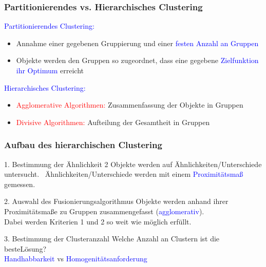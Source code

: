 \documentclass{beamer}
\begin{document}
\begin{frame}
 \frametitle{Partitionierendes vs. Hierarchisches Clustering}
 \textcolor{blue}{Partitionierendes Clustering:} \\
 \begin{itemize}
  \item Annahme einer gegebenen Gruppierung und einer \textcolor{blue}{festen Anzahl an Gruppen}

  \item Objekte werden den Gruppen so zugeordnet, dass eine gegebene \textcolor{blue}{Zielfunktion ihr Optimum} erreicht
 \end{itemize}

\textcolor{blue}{Hierarchisches Clustering:} \\
 \begin{itemize}
  \item \textcolor{red}{Agglomerative Algorithmen:} Zusammenfassung der Objekte in Gruppen %

  \item \textcolor{red}{Divisive Algorithmen:} Aufteilung der Gesamtheit in Gruppen
 \end{itemize}

\end{frame}

\begin{frame}
 \frametitle{Aufbau des hierarchischen Clustering}

 \begin{block}{1. Bestimmung der Ähnlichkeit}
  2 Objekte werden auf Ähnlichkeiten/Unterschiede untersucht. \
  Ähnlichkeiten/Unterschiede werden mit einem \textcolor{blue}{Proximitätsmaß} gemessen.  
 \end{block}

 \begin{block}{2. Auswahl des Fusionierungsalgorithmus}
  Objekte werden anhand ihrer Proximitätsmaße zu Gruppen zusammengefasst (\textcolor{blue}{agglomerativ}).   \\
  Dabei werden Kriterien 1 und 2 so weit wie möglich erfüllt.
 \end{block}

 \begin{block}{3. Bestimmung der Clusteranzahl}
  Welche Anzahl an Clustern ist die \glqq beste\grqq Lösung? \\
  \textcolor{blue}{Handhabbarkeit} vs \textcolor{blue}{Homogenitätsanforderung} 
 \end{block}

\end{frame}
\end{document}
